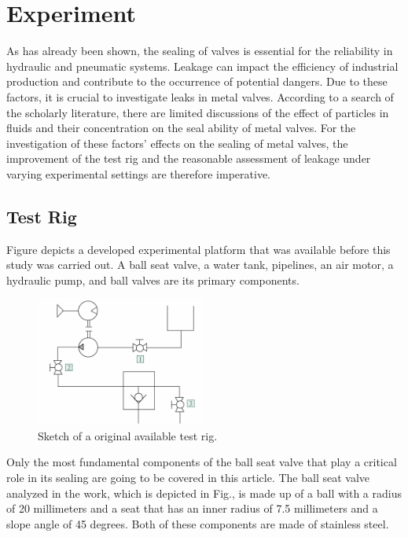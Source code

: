 \chapter{Experiment}
\label{ch:Experiment}
As has already been shown, the sealing of valves is essential for the reliability in hydraulic and pneumatic systems. Leakage can impact the efficiency
 of industrial production and contribute to the occurrence of potential dangers. 
Due to these factors, it is crucial to investigate leaks in metal valves. According to a search 
of the scholarly literature, there are limited discussions of the effect of particles in fluids 
and their concentration on the seal ability of metal valves. For the investigation of these 
factors' effects on the sealing of metal valves, the improvement of the test rig and the 
reasonable assessment of leakage under varying experimental settings are therefore imperative.

\section{Test Rig}
\label{Test Rig}
Figure  depicts a developed experimental platform that was available before this study 
was carried out. A ball seat valve, a water tank, pipelines, an air motor, a hydraulic pump,
and ball valves are its primary components.

\begin{figure}[htbp]
    \centering
    \includegraphics[width=0.5\textwidth]{figures/TestRig/oldTestRig.jpg}
    \caption{Sketch of a original available test rig.}
    \label{fig:oldTestRig}
\end{figure}

Only the most fundamental components of the ball seat valve that play a critical role in its sealing 
are going to be covered in this article. The ball seat valve analyzed in the work, which is depicted 
in Fig., is made up of a ball with a radius of 20 millimeters and a seat that has an
inner radius of 7.5 millimeters and a slope angle of 45 degrees. 
Both of these components are made of stainless steel.\\

